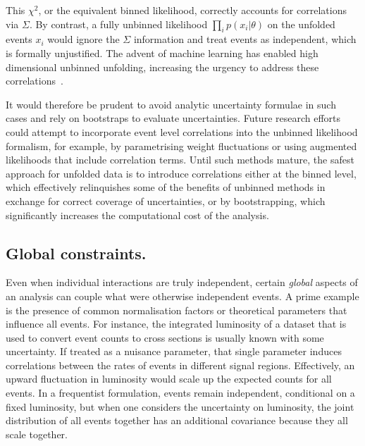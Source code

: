         This $\chi^2$, or the equivalent binned likelihood, correctly accounts for correlations via $\Sigma$.
        By contrast, a fully unbinned likelihood $\prod_i p(x_i|\theta)$ on the unfolded events $x_i$ would ignore the $\Sigma$ information and treat events as independent, which is formally unjustified.
        The advent of machine learning has enabled high dimensional unbinned unfolding, increasing the urgency to address these correlations~\cite{Andreassen:2021zzk, Canelli:2025ybb, Favaro:2025psi}.
        
        It would therefore be prudent to avoid analytic uncertainty formulae in such cases and rely on bootstraps to evaluate uncertainties.
        Future research efforts could attempt to incorporate event level correlations into the unbinned likelihood formalism, for example, by parametrising weight fluctuations or using augmented likelihoods that include correlation terms.
        Until such methods mature, the safest approach for unfolded data is to introduce correlations either at the binned level, which effectively relinquishes some of the benefits of unbinned methods in exchange for correct coverage of uncertainties, or by bootstrapping, which significantly increases the computational cost of the analysis.

    \subsection{Global constraints.}
    
        Even when individual interactions are truly independent, certain \emph{global} aspects of an analysis can couple what were otherwise independent events.
        A prime example is the presence of common normalisation factors or theoretical parameters that influence all events.
        For instance, the integrated luminosity of a dataset that is used to convert event counts to cross sections is usually known with some uncertainty.
        If treated as a nuisance parameter, that single parameter induces correlations between the rates of events in different signal regions.
        Effectively, an upward fluctuation in luminosity would scale up the expected counts for all events.
        In a frequentist formulation, events remain independent, conditional on a fixed luminosity, but when one considers the uncertainty on luminosity, the joint distribution of all events together has an additional covariance because they all scale together.
        
